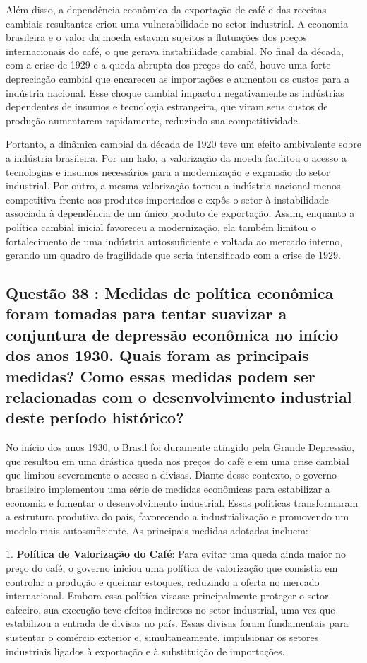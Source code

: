 \documentclass[a4paper,12pt]{article}[abntex2]
\begin{document}
Além disso, a dependência econômica da exportação de café e das receitas cambiais resultantes criou uma vulnerabilidade no setor industrial. A economia brasileira e o valor da moeda estavam sujeitos a flutuações dos preços internacionais do café, o que gerava instabilidade cambial. No final da década, com a crise de 1929 e a queda abrupta dos preços do café, houve uma forte depreciação cambial que encareceu as importações e aumentou os custos para a indústria nacional. Esse choque cambial impactou negativamente as indústrias dependentes de insumos e tecnologia estrangeira, que viram seus custos de produção aumentarem rapidamente, reduzindo sua competitividade.

Portanto, a dinâmica cambial da década de 1920 teve um efeito ambivalente sobre a indústria brasileira. Por um lado, a valorização da moeda facilitou o acesso a tecnologias e insumos necessários para a modernização e expansão do setor industrial. Por outro, a mesma valorização tornou a indústria nacional menos competitiva frente aos produtos importados e expôs o setor à instabilidade associada à dependência de um único produto de exportação. Assim, enquanto a política cambial inicial favoreceu a modernização, ela também limitou o fortalecimento de uma indústria autossuficiente e voltada ao mercado interno, gerando um quadro de fragilidade que seria intensificado com a crise de 1929.

\subsection{\textbf{Questão 38 : Medidas de política econômica foram tomadas para tentar suavizar a conjuntura de depressão econômica no início dos anos 1930. Quais foram as principais medidas? Como essas medidas podem ser relacionadas com o desenvolvimento industrial deste período histórico?}}

No início dos anos 1930, o Brasil foi duramente atingido pela Grande Depressão, que resultou em uma drástica queda nos preços do café e em uma crise cambial que limitou severamente o acesso a divisas. Diante desse contexto, o governo brasileiro implementou uma série de medidas econômicas para estabilizar a economia e fomentar o desenvolvimento industrial. Essas políticas transformaram a estrutura produtiva do país, favorecendo a industrialização e promovendo um modelo mais autossuficiente. As principais medidas adotadas incluem:

1. \textbf{Política de Valorização do Café}: Para evitar uma queda ainda maior no preço do café, o governo iniciou uma política de valorização que consistia em controlar a produção e queimar estoques, reduzindo a oferta no mercado internacional. Embora essa política visasse principalmente proteger o setor cafeeiro, sua execução teve efeitos indiretos no setor industrial, uma vez que estabilizou a entrada de divisas no país. Essas divisas foram fundamentais para sustentar o comércio exterior e, simultaneamente, impulsionar os setores industriais ligados à exportação e à substituição de importações.
\end{document}
